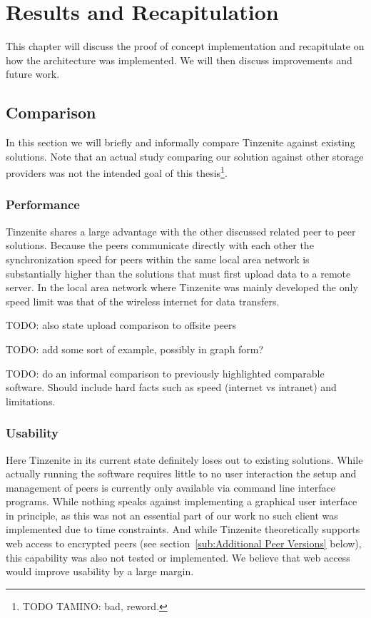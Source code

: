 \chapter{Results and Recapitulation}
\label{chap:Results and Recapitulation}

This chapter will discuss the proof of concept implementation and recapitulate on how the architecture was implemented.
We will then discuss improvements and future work.

\section{Comparison}

In this section we will briefly and informally compare Tinzenite against existing solutions.
Note that an actual study comparing our solution against other storage providers was not the intended goal of this thesis\footnote{TODO TAMINO: bad, reword.}.

\subsection{Performance}
\label{sub:Performance}

Tinzenite shares a large advantage with the other discussed related peer to peer solutions.
Because the peers communicate directly with each other the synchronization speed for peers within the same local area network is substantially higher than the solutions that must first upload data to a remote server.
In the local area network where Tinzenite was mainly developed the only speed limit was that of the wireless internet for data transfers.

TODO: also state upload comparison to offsite peers

TODO: add some sort of example, possibly in graph form?

TODO: do an informal comparison to previously highlighted comparable software.
Should include hard facts such as speed (internet vs intranet) and limitations.

\subsection{Usability}
\label{sub:Usability}

Here Tinzenite in its current state definitely loses out to existing solutions.
While actually running the software requires little to no user interaction the setup and management of peers is currently only available via command line interface programs.
While nothing speaks against implementing a graphical user interface in principle, as this was not an essential part of our work no such client was implemented due to time constraints.
And while Tinzenite theoretically supports web access to encrypted peers (see section~\ref{sub:Additional Peer Versions} below), this capability was also not tested or implemented.
We believe that web access would improve usability by a large margin.


